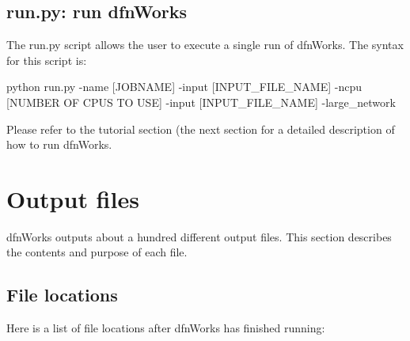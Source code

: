 \documentclass[letterpaper,10pt,english]{sphinxmanual}
\begin{document}
\section{run.py: run dfnWorks}
\label{scripts:run-py-run-dfnworks}
The run.py script allows the user to execute a single run of dfnWorks. The syntax for this script is:

python run.py -name {[}JOBNAME{]} -input {[}INPUT\_FILE\_NAME{]} -ncpu {[}NUMBER OF CPUS TO USE{]} -input {[}INPUT\_FILE\_NAME{]} -large\_network

Please refer to the tutorial section (the next section for a detailed description of how to run dfnWorks.


\chapter{Output files}
\label{output:output-files}\label{output::doc}
dfnWorks outputs about a hundred different output files. This section describes the contents and purpose of each file.


\section{File locations}
\label{output:file-locations}
Here is a list of file locations after dfnWorks has finished running:
\end{document}
